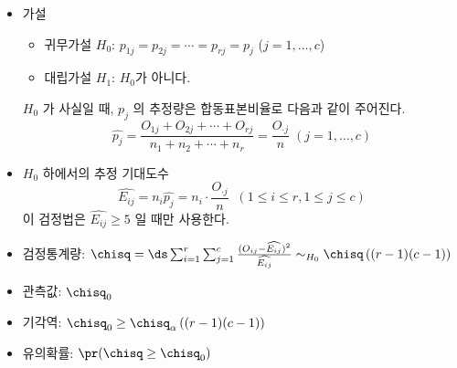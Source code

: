 {\begin{itemize}
	$$p_{i1},\; p_{i2},\; \dots,\; p_{ic} \qquad \left(i=1, \dots, r, \sum_{j=1}^c p_{ij} = 1\right)$$
	\item 가설
	\begin{itemize}
		\item 귀무가설 $H_0$: $p_{1j} = p_{2j} = \cdots = p_{rj} = p_j$ ($j = 1, \dots, c$)
		\item 대립가설 $H_1$: $H_0$가 아니다.
	\end{itemize}
	$H_0$ 가 사실일 때, $p_j$ 의 추정량은 합동표본비율로 다음과 같이 주어진다.
	$$\widehat{p_j} = \frac{O_{1j} + O_{2j}+\cdots + O_{rj}}{n_1+n_2+\cdots + n_r} = \frac{O_{\cdot j}}{n} \; (j=1, \dots, c)$$
	\item $H_0$ 하에서의 추정 기대도수
	$$\widehat{E_{ij}} = n_i \widehat{p_j} = n_i \cdot \frac{O_{\cdot j}}{n} \; \;(1\leq i\leq r, 1\leq j\leq c)$$
	이 검정법은 $\widehat{E_{ij}}\geq 5$ 일 때만 사용한다.
	\item 검정통계량: $\chisq = \ds \sum_{i=1}^r \sum_{j=1}^c \frac{(O_{ij}-\widehat{E_{ij}})^2}{\widehat{E_{ij}}} \sim_{H_0} \chisq\left((r-1)(c-1)\right)$
	\item 관측값: $\chisq_0$
	\item 기각역: $\chisq_0 \geq \chisq_{\alpha}\left((r-1)(c-1)\right)$
	\item 유의확률: $\pr(\chisq \geq \chisq_0)$
\end{itemize}
}

